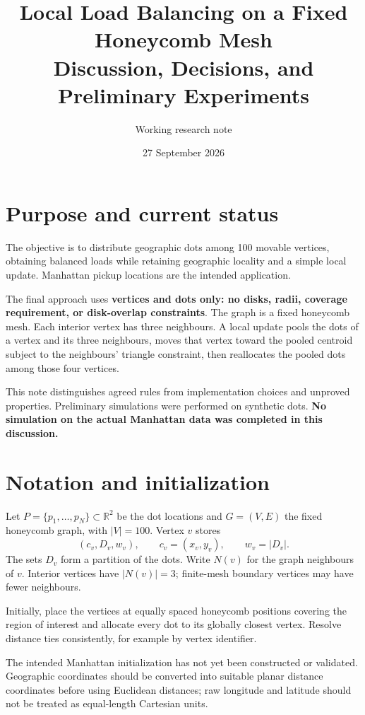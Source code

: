 \documentclass[11pt]{article}
\title{Local Load Balancing on a Fixed Honeycomb Mesh\\Discussion, Decisions, and Preliminary Experiments}
\author{Working research note}
\date{27 September 2026}
\begin{document}
\maketitle

\section{Purpose and current status}
The objective is to distribute geographic dots among 100 movable vertices, obtaining balanced loads while retaining geographic locality and a simple local update. Manhattan pickup locations are the intended application.

The final approach uses \textbf{vertices and dots only: no disks, radii, coverage requirement, or disk-overlap constraints}. The graph is a fixed honeycomb mesh. Each interior vertex has three neighbours. A local update pools the dots of a vertex and its three neighbours, moves that vertex toward the pooled centroid subject to the neighbours' triangle constraint, then reallocates the pooled dots among those four vertices.

This note distinguishes agreed rules from implementation choices and unproved properties. Preliminary simulations were performed on synthetic dots. \textbf{No simulation on the actual Manhattan data was completed in this discussion.}

\section{Notation and initialization}
Let $P=\{p_1,\ldots,p_N\}\subset\mathbb R^2$ be the dot locations and $G=(V,E)$ the fixed honeycomb graph, with $|V|=100$. Vertex $v$ stores
\[
(c_v,D_v,w_v),\qquad c_v=(x_v,y_v),\qquad w_v=|D_v|.
\]
The sets $D_v$ form a partition of the dots. Write $N(v)$ for the graph neighbours of $v$. Interior vertices have $|N(v)|=3$; finite-mesh boundary vertices may have fewer neighbours.

Initially, place the vertices at equally spaced honeycomb positions covering the region of interest and allocate every dot to its globally closest vertex. Resolve distance ties consistently, for example by vertex identifier.

The intended Manhattan initialization has not yet been constructed or validated. Geographic coordinates should be converted into suitable planar distance coordinates before using Euclidean distances; raw longitude and latitude should not be treated as equal-length Cartesian units.
\end{document}
